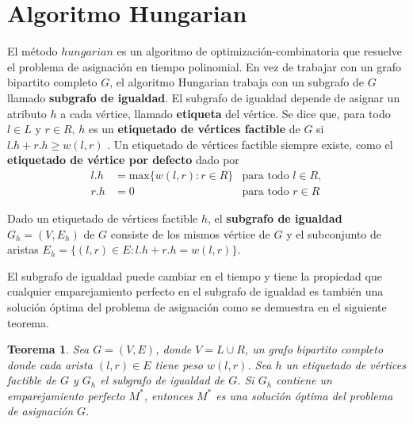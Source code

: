 \documentclass[10pt]{article} %
\newtheorem{thm}{Teorema}
\begin{document}
	\section{Algoritmo Hungarian}

	El método $ hungarian $ es un algoritmo de optimización-combinatoria que resuelve el problema de asignación en tiempo polinomial. En vez de trabajar con un grafo bipartito completo $G$, el algoritmo Hungarian trabaja con un subgrafo de $G$ llamado \textbf{subgrafo de igualdad}. El subgrafo de igualdad depende de asignar un atributo $h$ a cada v\'ertice, llamado \textbf{etiqueta} del v\'ertice. Se dice que, para todo $l \in L$ y $r \in R$,  $h$ es un \textbf{etiquetado de vértices factible} de $G$ si $l.h + r.h \geq w(l,r)$ . Un etiquetado de v\'ertices factible siempre existe, como el \textbf{etiquetado de v\'ertice por defecto} dado por
	\begin{align}
		\label{eq:defecto}
		l.h &= \text{max} \{w(l,r):r \in R\} &\text{para todo } l \in R,\\
		r.h &= 0 &\text{para todo } r \in R 
	\end{align}
	
	Dado un etiquetado de v\'ertices factible $h$, el \textbf{subgrafo de igualdad} $G_h = (V, E_h)$ de $G$ consiste de los mismos v\'ertice de $G$ y el subconjunto de aristas $E_h = \{(l,r) \in E: l.h + r.h = w(l,r)\}$.
	
	El subgrafo de igualdad puede cambiar en el tiempo y tiene la propiedad que cualquier emparejamiento perfecto en el subgrafo de igualdad es tambi\'en una soluci\'on \'optima del problema de asignaci\'on como se demuestra en el siguiente teorema.
	\begin{thm} \cite{introduction}
		\label{thm: emparejamiento}
		Sea $G=(V,E)$, donde $V = L \cup R$, un grafo bipartito completo donde cada arista $(l,r) \in E$ tiene peso $w(l,r)$. Sea $h$ un etiquetado de v\'ertices factible de $G$ y $G_h$ el subgrafo de igualdad de $G$. Si $G_h$ contiene un emparejamiento perfecto $M^*$, entonces $M^*$ es una soluci\'on \'optima del problema de asignaci\'on $G$. 
		
	\end{thm}
	
\end{document}

